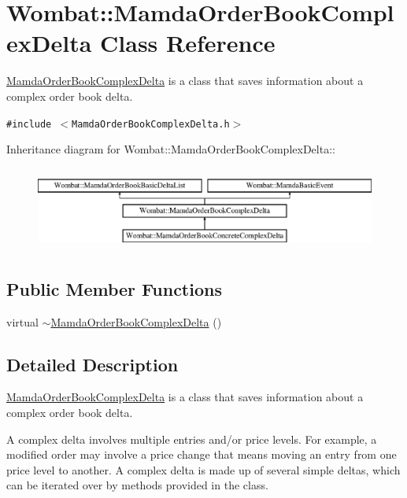 \hypertarget{classWombat_1_1MamdaOrderBookComplexDelta}{
\section{Wombat::Mamda\-Order\-Book\-Complex\-Delta Class Reference}
\label{classWombat_1_1MamdaOrderBookComplexDelta}
}
\hyperlink{classWombat_1_1MamdaOrderBookComplexDelta}{Mamda\-Order\-Book\-Complex\-Delta} is a class that saves information about a complex order book delta.  


{\tt \#include $<$Mamda\-Order\-Book\-Complex\-Delta.h$>$}

Inheritance diagram for Wombat::Mamda\-Order\-Book\-Complex\-Delta::\begin{figure}[H]
\begin{center}
\leavevmode
\includegraphics[height=2.78146cm]{classWombat_1_1MamdaOrderBookComplexDelta}
\end{center}
\end{figure}
\subsection*{Public Member Functions}
\begin{CompactItemize}
\item 
virtual \hyperlink{classWombat_1_1MamdaOrderBookComplexDelta_6755150cff12ca7f5ae23be1658c94b5}{$\sim$Mamda\-Order\-Book\-Complex\-Delta} ()
\end{CompactItemize}


\subsection{Detailed Description}
\hyperlink{classWombat_1_1MamdaOrderBookComplexDelta}{Mamda\-Order\-Book\-Complex\-Delta} is a class that saves information about a complex order book delta. 

A complex delta involves multiple entries and/or price levels. For example, a modified order may involve a price change that means moving an entry from one price level to another. A complex delta is made up of several simple deltas, which can be iterated over by methods provided in the class. 



